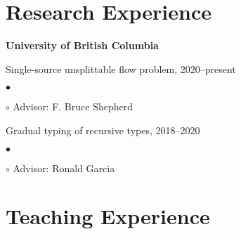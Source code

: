 \documentclass[margin,line]{res}
\newenvironment{list1}{
  \begin{list}{\ding{113}}{%
      \setlength{\itemsep}{0in}
      \setlength{\parsep}{0.025in} \setlength{\parskip}{0in}
      \setlength{\topsep}{0in} \setlength{\partopsep}{0in}
      \setlength{\leftmargin}{0.17in}}}{\end{list}}
\newenvironment{list2}{
  \begin{list}{$\bullet$}{%
      \setlength{\itemsep}{0in}
      \setlength{\parsep}{0in} \setlength{\parskip}{0in}
      \setlength{\topsep}{0in} \setlength{\partopsep}{0in}
      \setlength{\leftmargin}{0.2in}}}{\end{list}}
\begin{document}
\begin{resume}











\section{\sc Research Experience}

{\bf University of British Columbia}\\
\vspace*{-.1in}
\begin{list1}
\item[] Single-source unsplittable flow problem, 2020--present
  \begin{list2}
  \item[$\circ$] Advisor: F. Bruce Shepherd
  \end{list2}
\item[] Gradual typing of recursive types, 2018--2020
  \begin{list2}
  \item[$\circ$] Advisor: Ronald Garcia
  \end{list2}
\end{list1}


\section{\sc Teaching Experience}


\end{resume}
\end{document}
